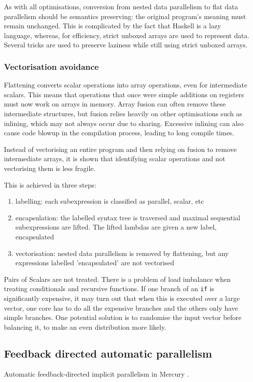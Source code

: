As with all optimisations, conversion from nested data parallelism to flat data parallelism should be semantics preserving:
the original program's meaning must remain unchanged.
This is complicated by the fact that Haskell is a lazy language, whereas, for efficiency, strict unboxed arrays are used to represent data.
Several tricks are used to preserve laziness while still using strict unboxed arrays.


\subsubsection{Vectorisation avoidance}

Flattening converts scalar operations into array operations, even for intermediate scalars.
This means that operations that once were simple additions on registers must now work on arrays in memory.
Array fusion can often remove these intermediate structures, but fusion relies heavily on other optimisations such as inlining,
which may not always occur due to sharing. Excessive inlining can also cause code blowup in the compilation process,
leading to long compile times.

Instead of vectorising an entire program and then relying on fusion to remove intermediate arrays,
it is shown that identifying scalar operations and not vectorising them is less fragile.

This is achieved in three steps:
\begin{enumerate}
\item labelling: each subexpression is classified as parallel, scalar, etc
\item encapsulation: the labelled syntax tree is traversed and maximal sequential subexpressions are lifted.
The lifted lambdas are given a new label, encapsulated
\item vectorisation: nested data parallelism is removed by flattening, but any expressions labelled 'encapsulated' are not vectorised
\end{enumerate}

Pairs of Scalars are not treated.
There is a problem of load imbalance when treating conditionals and recursive functions.
If one branch of an \verb/if/ is significantly expensive, it may turn out that when this is executed over a large vector,
one core has to do all the expensive branches and the others only have simple branches.
One potential solution is to randomise the input vector before balancing it, to make an even distribution more likely.




\subsection{Feedback directed automatic parallelism}
Automatic feedback-directed implicit parallelism in Mercury \cite{bone2010automatic}.

